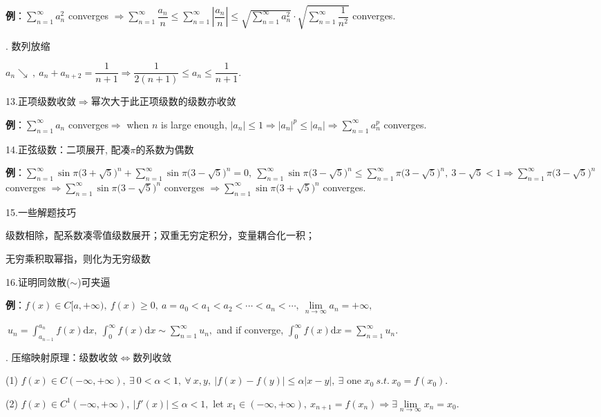 \documentclass[UTF8]{ctexart}
\newcommand\dif{\mathrm{d}}
\newcommand\no{\noindent}
\newcommand\dis{\displaystyle}
\newcommand\ls{\leqslant}
\newcommand\gs{\geqslant}
\newcommand\limn{\dis\lim\limits_{n\to\infty}}
\newcommand\sumn{\dis\sum\limits_{n=1}^{\infty}}
\newcommand\intd{\dis\int}
\begin{document}
\begin{spacing}{2}
\vspace{0.3cm}

\textbf{例}：$\sumn a_n^2$ converges $\Longrightarrow\sumn \dfrac{a_n}{n}\ls\sumn \left|\dfrac{a_n}{n}\right|\ls\sqrt{\sumn a_n^2}\cdot\sqrt{\sumn \dfrac{1}{n^2}}$ converges.

\no12. 数列放缩

$a_n\searrow\ ,\ a_n+a_{n+2}=\dfrac{1}{n+1}\Longrightarrow
\dfrac{1}{2(n+1)}\ls a_n\ls\dfrac{1}{n+1}.$

\no13.正项级数收敛$\Longrightarrow$幂次大于此正项级数的级数亦收敛

\textbf{例}：$\sumn a_n$ converges$\Longrightarrow$ when $n$ is large enough, 
$|a_n|\ls1\Longrightarrow|a_n|^p\ls|a_n|\Longrightarrow\sumn a_n^p$ converges.

\vspace{0.2cm}

\no14.正弦级数：二项展开, 配凑$\pi$的系数为偶数

\textbf{例}：$\sumn \sin\pi\Big(3+\sqrt{5}\Big)^n+\sumn \sin\pi\Big(3-\sqrt{5}\Big)^n
=0,\ \sumn \sin\pi\Big(3-\sqrt{5}\Big)^n\ls\sumn \pi\Big(3-\sqrt{5}\Big)^n,\ 3-\sqrt{5}<1\Longrightarrow\sumn \pi\Big(3-\sqrt{5}\Big)^n$ converges $\Longrightarrow\sumn \sin\pi\Big(3-\sqrt{5}\Big)^n$ converges $\Longrightarrow\sumn \sin\pi\Big(3+\sqrt{5}\Big)^n$ converges.

\vspace{0.2cm}

\no15.一些解题技巧

级数相除，配系数凑零值级数展开；双重无穷定积分，变量耦合化一积；

无穷乘积取幂指，则化为无穷级数

\no16.证明同敛散($\sim$)可夹逼

\textbf{例}：$f(x)\in C[a,+\infty),\ f(x)\gs0,\ a=a_0<a_1<a_2<\cdots<a_n<\cdots,\ 
\limn a_n=+\infty,$

$\ u_n=\intd_{a_{n-1}}^{a_n}f(x)\dif x,\ \intd_0^\infty f(x)\dif x\sim\sumn u_n,$ 
and if converge, $\intd_0^\infty f(x)\dif x=\sumn u_n.$

\vspace{0.2cm}

\no17. \textcolor[rgb]{1,0,0}{压缩映射}原理：级数收敛$\Longleftrightarrow$数列收敛

(1) $f(x)\in C(-\infty,+\infty),\ \exists\ 0<\alpha<1,\ \forall\ x,y,\ |f(x)-f(y)|\ls\alpha|x-y|,\ 
\exists$ one $x_0\ s.t.\ x_0=f(x_0).$

(2) $f(x)\in C^1(-\infty,+\infty),\ |f'(x)|\ls\alpha<1,$ let $x_1\in(-\infty,+\infty),\ 
x_{n+1}=f(x_n)\Longrightarrow\exists\limn x_n=x_0.$


\end{spacing}
\end{document}
